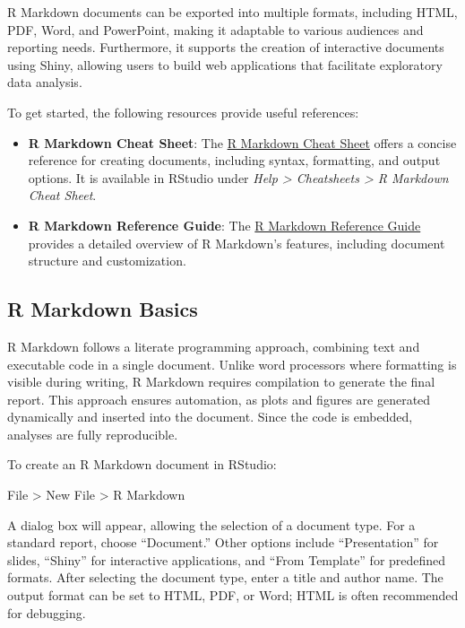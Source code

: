 \documentclass[
]{book}
\providecommand{\tightlist}{%
  \setlength{\itemsep}{0pt}\setlength{\parskip}{0pt}}
\theoremstyle{definition}
\theoremstyle{definition}
\theoremstyle{definition}
\theoremstyle{definition}
\theoremstyle{remark}
\begin{document}
R Markdown documents can be exported into multiple formats, including HTML, PDF, Word, and PowerPoint, making it adaptable to various audiences and reporting needs. Furthermore, it supports the creation of interactive documents using Shiny, allowing users to build web applications that facilitate exploratory data analysis.

To get started, the following resources provide useful references:

\begin{itemize}
\tightlist
\item
  \textbf{R Markdown Cheat Sheet}: The \href{https://rstudio.com/wp-content/uploads/2016/03/rmarkdown-cheatsheet-2.0.pdf}{R Markdown Cheat Sheet} offers a concise reference for creating documents, including syntax, formatting, and output options. It is available in RStudio under \emph{Help \textgreater{} Cheatsheets \textgreater{} R Markdown Cheat Sheet}.\\
\item
  \textbf{R Markdown Reference Guide}: The \href{https://rstudio.com/wp-content/uploads/2015/03/rmarkdown-reference.pdf}{R Markdown Reference Guide} provides a detailed overview of R Markdown's features, including document structure and customization.
\end{itemize}

\subsection*{R Markdown Basics}\label{r-markdown-basics}

R Markdown follows a literate programming approach, combining text and executable code in a single document. Unlike word processors where formatting is visible during writing, R Markdown requires compilation to generate the final report. This approach ensures automation, as plots and figures are generated dynamically and inserted into the document. Since the code is embedded, analyses are fully reproducible.

To create an R Markdown document in RStudio:

File \textgreater{} New File \textgreater{} R Markdown

A dialog box will appear, allowing the selection of a document type. For a standard report, choose ``Document.'' Other options include ``Presentation'' for slides, ``Shiny'' for interactive applications, and ``From Template'' for predefined formats. After selecting the document type, enter a title and author name. The output format can be set to HTML, PDF, or Word; HTML is often recommended for debugging.
\end{document}
